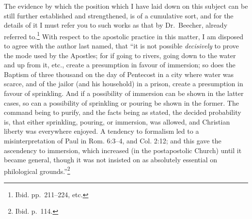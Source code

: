 \documentclass[
]{book}
\begin{document}
The evidence by which the position which I have laid down on this subject can be still further established and strengthened, is of a cumulative sort, and for the details of it I must refer you to such works as that by Dr.~Beecher, already referred to.\footnote{Ibid. pp.~211--224, etc.} With respect to the apostolic practice in this matter, I am disposed to agree with the author last named, that ``it is not possible \emph{decisively} to prove the mode used by the Apostles; for if going to rivers, going down to the water and up from it, etc., create a presumption in favour of immersion; so does the Baptism of three thousand on the day of Pentecost in a city where water was scarce, and of the jailor (and his household) in a prison, create a presumption in favour of sprinkling. And if a possibility of immersion can be shown in the latter cases, so can a possibility of sprinkling or pouring be shown in the former. The command being to purify, and the facts being as stated, the decided probability is, that either sprinkling, pouring, or immersion, was allowed, and Christian liberty was everywhere enjoyed. A tendency to formalism led to a misinterpretation of Paul in Rom. 6:3--4, and Col. 2:12; and this gave the ascendency to immersion, which increased (in the postapostolic Church) until it became general, though it was not insisted on as absolutely essential on philological grounds.''\footnote{Ibid. p.~114.}
\end{document}
